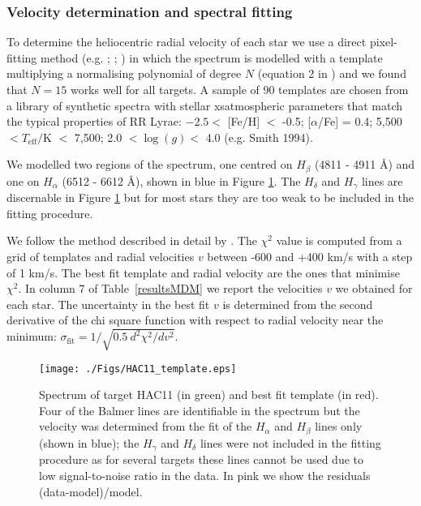 \documentclass[useAMS,usenatbib]{mn2e}
\begin{document}
\subsubsection{Velocity determination and spectral fitting}
To determine the heliocentric radial velocity of each star we use a direct pixel-fitting method (e.g. \citealt{Ca04}; \citealt{Ko09}; \citealt{Ko11}) in which the spectrum is modelled with a template multiplying a normalising polynomial of degree $N$ (equation 2 in \citealt{Ko11}) and we found that $N = 15$ works well for all targets.
A sample of 90 templates are chosen from a library of synthetic spectra \citep{Mu05} with stellar xsatmospheric parameters  that match the typical properties of RR Lyrae: $-2.5  <$ [Fe/H] $<$ -0.5; [$\alpha$/Fe] = 0.4;  5,500 $< T_{\mathrm{eff}}/$K $<$ 7,500; 2.0 $< \log(\textit{g}) < $ 4.0 (e.g. Smith 1994). 


We modelled two regions of the spectrum, one centred on $H_{\beta}$ (4811 - 4911 \AA)  and one on  $H_{\alpha}$ (6512 - 6612 \AA ), shown in blue in Figure \ref{1dspec}. The  $H_{\delta}$ and  $H_{\gamma}$ lines are discernable in Figure \ref{1dspec} but for most stars they are too weak to be included in the fitting procedure.

We follow the method described in detail by \citet{Ko11}. The $\chi^{2}$ value is computed from a grid of templates and radial velocities $v$ between -600 and +400 km/s with a step of 1 km/s. The best fit template and radial velocity are the ones that minimise $\chi^{2}$.  In column 7 of Table~\ref{resultsMDM} we report the velocities $v$ we obtained for each star. The uncertainty in the best fit $v$ is determined from the second derivative of the chi square function with respect to radial velocity near the minimum: $\sigma_{\mathrm{fit}}= 1/\sqrt{0.5 ~ d^{2} \chi^{2}/d v^{2}} $. 
\begin{figure}
	\hspace{-0.4cm}
	 \texttt{[image: ./Figs/HAC11\_template.eps]} 
	\caption[Spectra of HAC11 and best fit templates]{Spectrum of target HAC11 (in green) and best fit template (in red). Four of the Balmer lines are identifiable in the spectrum but the velocity was determined from the fit of the $H_{\alpha}$ and $H_{\beta}$ lines only (shown in blue); the  $H_{\gamma}$ and  $H_{\delta}$ lines were not included in the fitting procedure as for several targets these lines cannot be used due to low signal-to-noise ratio in the data. In pink we show the residuals (data-model)/model.}
	\label{1dspec}
\end{figure}
\end{document}
